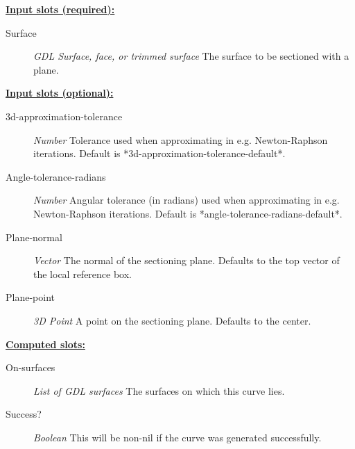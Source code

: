 \documentclass [11pt]{book}
\begin{document}
\begin{itemize}
\textbf{
\underline{Input slots (required):}}

\begin{description}

\item [Surface]
\emph{GDL Surface, face, or trimmed surface} The surface to be sectioned with a plane.


\end{description}






\textbf{
\underline{Input slots (optional):}}

\begin{description}

\item [3d-approximation-tolerance]
\emph{Number} Tolerance used when approximating in e.g. Newton-Raphson iterations.
Default is *3d-approximation-tolerance-default*.


\item [Angle-tolerance-radians]
\emph{Number} Angular tolerance (in radians) used when approximating in e.g. Newton-Raphson iterations.
Default is *angle-tolerance-radians-default*.


\item [Plane-normal]
\emph{Vector} The normal of the sectioning plane. Defaults to the top vector of the local reference box.


\item [Plane-point]
\emph{3D Point} A point on the sectioning plane. Defaults to the center.


\end{description}






\textbf{
\underline{Computed slots:}}

\begin{description}

\item [On-surfaces]
\emph{List of GDL surfaces} The surfaces on which this curve lies.


\item [Success?]
\emph{Boolean} This will be non-nil if the curve was generated successfully.



\end{description}
\end{itemize}
\end{document}

